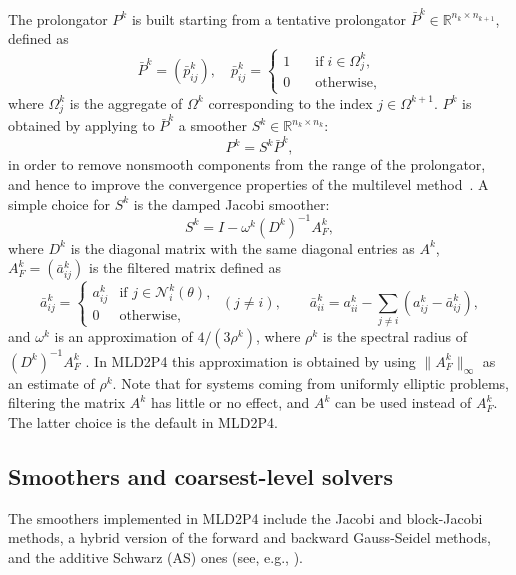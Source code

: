 The prolongator $P^k$ is built starting from a tentative prolongator
$\bar{P}^k \in \mathbb{R}^{n_k \times n_{k+1}}$, defined as
\begin{equation}
\bar{P}^k =(\bar{p}_{ij}^k), \quad  \bar{p}_{ij}^k = 
\left\{ \begin{array}{ll}
1 & \quad \mbox{if} \; i \in \Omega^k_j, \\
0 & \quad \mbox{otherwise},
\end{array} \right.
\label{eq:tent_prol}
\end{equation}
where $\Omega^k_j$ is the aggregate of $\Omega^k$
corresponding to the index $j \in \Omega^{k+1}$.
$P^k$ is obtained by applying to $\bar{P}^k$ a smoother
$S^k \in \mathbb{R}^{n_k \times n_k}$:
$$
P^k = S^k \bar{P}^k,
$$
in order to remove nonsmooth components from the range of the prolongator,
and hence to improve the convergence properties of the multilevel
method~\cite{BREZINA_VANEK,Stuben_01}.
A simple choice for $S^k$ is the damped Jacobi smoother:
\[
S^k = I - \omega^k (D^k)^{-1} A^k_F , 
\]
where $D^k$ is the diagonal matrix with the same diagonal entries as $A^k$,
$A^k_F = (\bar{a}_{ij}^k)$ is the filtered matrix defined as
\begin{equation}
\label{eq:filtered}
  \bar{a}_{ij}^k =
   \left \{ \begin{array}{ll}
   a_{ij}^k & \mbox{if } j \in \mathcal{N}_i^k(\theta), \\
   0            & \mbox{otherwise},
   \end{array} \right.
   \; (j \ne i),
   \qquad
   \bar{a}_{ii}^k = a_{ii}^k - \sum_{j \ne i} (a_{ij}^k - \bar{a}_{ij}^k),
\end{equation}
and $\omega^k$ is an approximation of $4/(3\rho^k)$, where
$\rho^k$ is the spectral radius of $(D^k)^{-1}A^k_F$ \cite{BREZINA_VANEK}.
In MLD2P4 this approximation is obtained by using $\| A^k_F \|_\infty$ as an estimate
of $\rho^k$. Note that for systems coming from uniformly elliptic
problems, filtering the matrix $A^k$ has little or no effect, and
$A^k$ can be used instead of $A^k_F$. The latter choice is the default in MLD2P4.

\subsection{Smoothers and coarsest-level solvers\label{sec:smoothers}}

The smoothers implemented in MLD2P4 include the Jacobi and block-Jacobi methods,
a hybrid version of the forward and backward Gauss-Seidel methods, and the
additive Schwarz (AS) ones (see, e.g., \cite{Saad_book,dd2_96}). 

